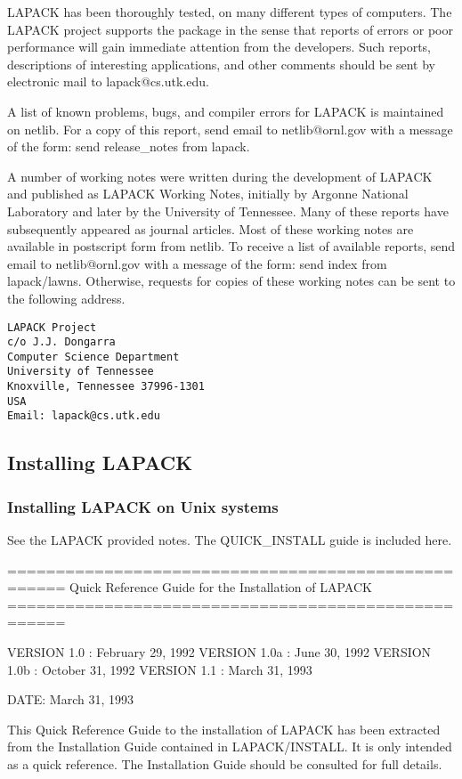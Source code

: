 LAPACK has been thoroughly tested, on many different
types of computers.  The LAPACK project supports the package in the
sense that reports of errors or poor performance will gain immediate
attention from the developers. Such reports, descriptions
of interesting applications, and other comments should be sent by
electronic mail to lapack@cs.utk.edu.

A list of known problems, bugs, and compiler errors for LAPACK is
maintained on netlib.  For a copy of this report, send email to
netlib@ornl.gov with a message of the form: send release\_notes from lapack.

A number of working notes were written during the
development of LAPACK and published as LAPACK Working Notes,
initially by Argonne National Laboratory and later by the University
of Tennessee.  Many of these reports have subsequently appeared as journal
articles.  Most of these working notes are available in postscript form
from netlib.  To receive a list of available reports, send email to
netlib@ornl.gov with a message of the form: send index from lapack/lawns.
Otherwise, requests for copies of these working notes can be sent to
the following address.

\begin{verbatim}
LAPACK Project
c/o J.J. Dongarra
Computer Science Department
University of Tennessee
Knoxville, Tennessee 37996-1301
USA
Email: lapack@cs.utk.edu
\end{verbatim}

\subsection{Installing LAPACK}

\subsubsection{Installing LAPACK on Unix systems}

See the LAPACK provided notes. The QUICK\_INSTALL guide
is included here.

====================================================
Quick Reference Guide for the Installation of LAPACK
====================================================

VERSION 1.0  :  February 29, 1992
VERSION 1.0a :  June 30, 1992
VERSION 1.0b :  October 31, 1992
VERSION 1.1  :  March 31, 1993

DATE:  March 31, 1993 

This Quick Reference Guide to the installation of LAPACK has been
extracted from the Installation Guide contained in LAPACK/INSTALL.
It is only intended as a quick reference.  The Installation Guide should
be consulted for full details.

